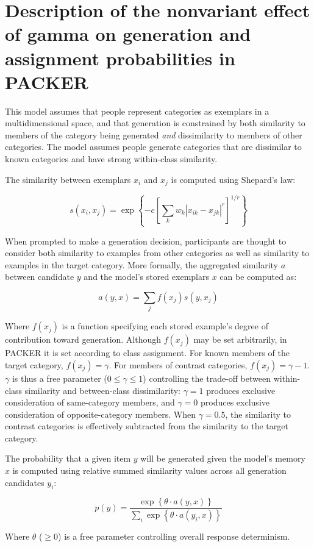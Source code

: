 \documentclass[12pt]{article}
\begin{document}
\section{Description of the nonvariant effect of gamma on generation and assignment probabilities in PACKER}


This model assumes that people represent categories as exemplars in a multidimensional space, and that generation is constrained by both similarity to members of the category being generated \textit{and} dissimilarity to members of other categories. The model assumes people generate categories that are dissimilar to known categories and have strong within-class similarity.

The similarity between exemplars $x_i$ and $x_j$ is computed using Shepard's law:

\begin{equation}
s\left(x_i,x_j\right) = \exp \left\{ -c \left[\sum_{k}{ w_k \left| x_{ik} - x_{jk} \right|^r }\right]^{1/r} \right\}
\label{eq:similarity}
\end{equation}

When prompted to make a generation decision, participants are thought to consider both similarity to examples from other categories as well as similarity to examples in the target category. More formally, the aggregated similarity $a$ between candidate $y$ and the model's stored exemplars $x$ can be computed as:

\begin{equation}
  a(y, x) = \sum_j{f(x_j) s(y, x_j)}
\end{equation}

Where $f(x_j)$ is a function specifying each stored example's degree of contribution toward generation. Although $f(x_j)$ may be set arbitrarily, in PACKER it is set according to class assignment. For known members of the target category, $f(x_j) = \gamma$. For members of contrast categories, $f(x_j) = \gamma - 1$. $\gamma$ is thus a free parameter ($0 \leq \gamma \leq 1$) controlling the trade-off between within-class similarity and between-class dissimilarity: $\gamma = 1$ produces exclusive consideration of same-category members, and $\gamma = 0$ produces exclusive consideration of opposite-category members. When $\gamma = 0.5$, the similarity to contrast categories is effectively subtracted from the similarity to the target category.

The probability that a given item $y$ will be generated given the model's memory $x$ is computed using relative summed similarity values across all generation candidates $y_i$:

\begin{equation}
p(y) = \dfrac
{ \exp  \left \{ \theta \cdot a \left( y, x \right) \right \} } 
{ \sum_i{ \exp  \left \{ \theta \cdot a \left( y_i, x \right) \right\}  } }
\label{eq:packer-choice}
\end{equation}

Where $\theta$ ($\geq 0$) is a free parameter controlling overall response determinism.
\end{document}
